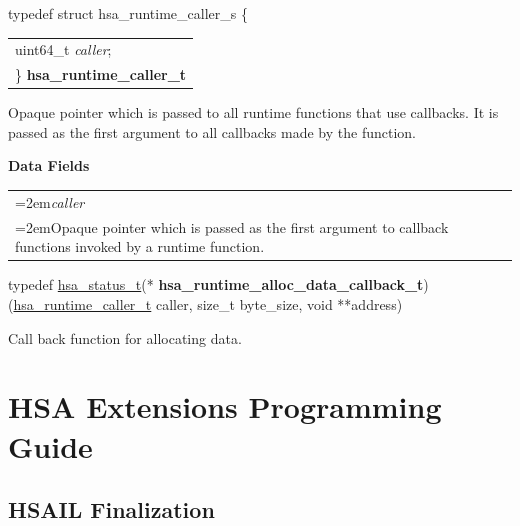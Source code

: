 \documentclass[final]{book}
\newcommand{\reffld}[1]{\textit{#1}}
\begin{document}
\noindent\begin{tcolorbox}[breakable,nobeforeafter,arc=0mm,colframe=white,colback=lightgray,left=0mm]
typedef struct  hsa_runtime_caller_s \{
\vspace{-3.5mm}\begin{longtable}{@{}p{\textwidth}}
\hspace{1.7em}uint64_t \reffld{caller};\\
\}  \hypertarget{group__RuntimeCommon_1ga7d9b1191602415f5dd3893985cc93826}{\textbf{hsa_runtime_caller_t}}
\end{longtable}

\end{tcolorbox}
Opaque pointer which is passed to all runtime functions that use callbacks. It is passed as the first argument to all callbacks made by the function.

\noindent\textbf{Data Fields}\\[-6mm]
\begin{longtable}{@{}>{\hangindent=2em}p{\textwidth}}
\reffld{caller}\\\hspace{2em}Opaque pointer which is passed as the first argument to callback functions invoked by a runtime function.
\end{longtable}



\noindent\begin{tcolorbox}[nobeforeafter,arc=0mm,colframe=white,colback=lightgray,left=0mm]
typedef \hyperlink{group__status_1gad755322e7ff95456520e8abdbe90d225}{hsa_status_t}(*  \hypertarget{group__RuntimeCommon_1ga30804c05fe32b4ab9da480280dba8cc5}{\textbf{hsa_runtime_alloc_data_callback_t}})(\hyperlink{group__RuntimeCommon_1ga7d9b1191602415f5dd3893985cc93826}{hsa_runtime_caller_t} caller, size_t byte_size, void **address)
\end{tcolorbox}
Call back function for allocating data.
\\ 


\chapter{HSA Extensions Programming Guide}

\section{HSAIL Finalization}
\label{finalizerchapter} \hypertarget{finalizerchapter}{}
\end{document}
